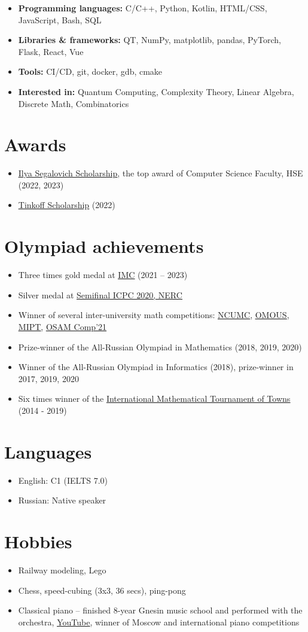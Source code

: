 \documentclass[letterpaper,11pt]{article}
\newcommand{\resumeItemListStart}{\begin{itemize}}
\newcommand{\resumeItemListEnd}{\end{itemize}\vspace{-8pt}}
\newcommand{\resumeItem}[1]{\item\small{{#1 \vspace{-2pt}}}}
\newcommand{\resumeSubItem}[1]{\resumeItem{#1}\vspace{-4pt}}
\begin{document}
\resumeItemListStart
\resumeSubItem{\textbf{Programming languages: }{C/C++, Python, Kotlin, HTML/CSS, JavaScript, Bash, SQL}}
\resumeSubItem{\textbf{Libraries \& frameworks: }{QT, NumPy, matplotlib, pandas, PyTorch, Flask, React, Vue}}
\resumeSubItem{\textbf{Tools: }{CI/CD, git, docker, gdb, cmake}}
\resumeSubItem{\textbf{Interested in: }{Quantum Computing, Complexity Theory, Linear Algebra, Discrete Math, Combinatorics}}
\resumeItemListEnd


\section{Awards}

\resumeItemListStart
\resumeSubItem{\href{https://cs.hse.ru/en/stipend}{\underline{Ilya Segalovich Scholarship}}, the top award of Computer Science Faculty, HSE (2022, 2023)}
\resumeSubItem{\href{https://www.tinkoff.ru/about/news/06042022-tinkoff-launches-scholarship-programme-for-russias-young-talent-eng/}{\underline{Tinkoff Scholarship}} (2022)}
\resumeItemListEnd


\section{Olympiad achievements}

\resumeItemListStart
\resumeSubItem{Three times gold medal at \href{https://imc-math.org.uk}{\underline{IMC}} (2021 -- 2023)}
\resumeSubItem{Silver medal at \href{https://neerc.ifmo.ru/archive/2020.html}{\underline{Semifinal ICPC 2020, NERC}}}
\resumeSubItem{Winner of several inter-university math competitions: \href{https://iuhd.edu.tm/competition/44}{\underline{NCUMC}}, \href{https://iuhd.edu.tm/competition/45}{\underline{OMOUS}}, \href{http://www.rkarasev.ru/note/66}{\underline{MIPT}}, \href{https://cs.hse.ru/en/announcements/504365867.html}{\underline{OSAM Comp'21}}}
\resumeSubItem{Prize-winner of the All-Russian Olympiad in Mathematics (2018, 2019, 2020)}
\resumeSubItem{Winner of the All-Russian Olympiad in Informatics (2018), prize-winner in 2017, 2019, 2020}
\resumeSubItem{Six times winner of the \href{https://www.turgor.ru/en/}{\underline{International Mathematical Tournament of Towns}} (2014 - 2019)}
\resumeItemListEnd


\section{Languages}

\resumeItemListStart
\resumeSubItem{English: C1 (IELTS 7.0)}
\resumeSubItem{Russian: Native speaker}
\resumeItemListEnd


\section{Hobbies}

\resumeItemListStart
\resumeSubItem{Railway modeling, Lego}
\resumeSubItem{Chess, speed-cubing (3x3, 36 secs), ping-pong}
\resumeSubItem{Classical piano -- finished 8-year Gnesin music school and performed with the orchestra, \href{https://www.youtube.com/user/FeodorKuyanov/playlists}{\underline{YouTube}}, winner of Moscow and international piano competitions}
\resumeItemListEnd
\end{document}
